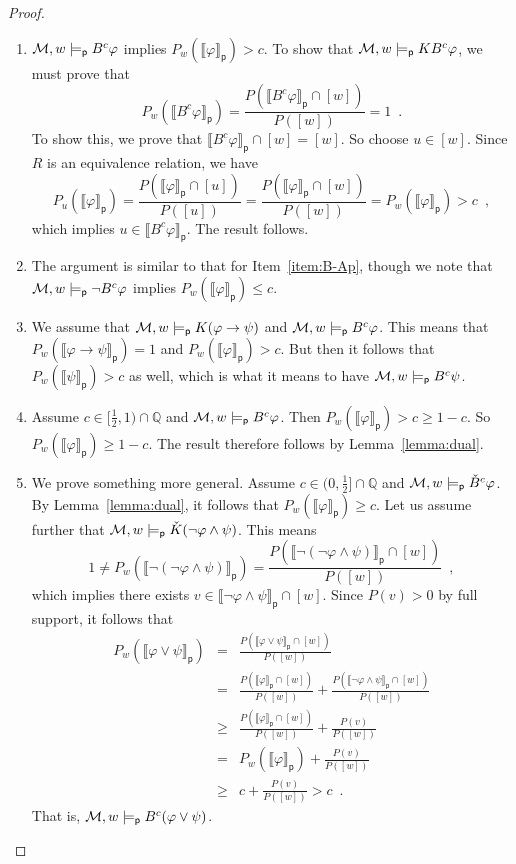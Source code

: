 \documentclass[12pt]{article}
\theoremstyle{definition}
\newcommand{\Rat}{\mathbb{Q}}  %
\newcommand{\M}{{\cal M}}      %
\newcommand{\modelsp}{\models_{\mathsf{p}}}                  %
\newcommand{\semp}[1]{\llbracket{#1}\rrbracket_{\mathsf{p}}} %
\begin{document}
\begin{proof}
\begin{enumerate}
  \item $\M,w\modelsp B^c\varphi$ implies $P_w(\semp{\varphi})>c$.  To show
    that $\M,w\modelsp KB^c\varphi$, we must prove that
    \[
    P_w(\semp{B^c\varphi})=
    \frac{P(\semp{B^c\varphi}\cap[w])}{P([w])} =1\enspace.
    \]
    To show this, we prove that $\semp{B^c\varphi}\cap[w]=[w]$.  So
    choose $u\in[w]$.  Since $R$ is an equivalence relation, we have
    \begin{equation*}
      P_u(\semp{\varphi})=
      \frac{P(\semp{\varphi}\cap[u])}{P([u])}=
      \frac{P(\semp{\varphi}\cap[w])}{P([w])}=
      P_w(\semp{\varphi})>c\enspace,
    \end{equation*}
    which implies $u\in\semp{B^c\varphi}$.  The result follows.
    
  \item The argument is similar to that for Item~\ref{item:B-Ap},
    though we note that $\M,w\modelsp\lnot B^c\varphi$ implies
    $P_w(\semp{\varphi})\leq c$.
    
  \item We assume that $\M,w\modelsp K(\varphi\to\psi)$ and
    $\M,w\modelsp B^c\varphi$.  This means that
    $P_w(\semp{\varphi\to\psi})=1$ and $P_w(\semp{\varphi})>c$.  But then it
    follows that $P_w(\semp{\psi})>c$ as well, which is what it means
    to have $\M,w\modelsp B^c\psi$.


  \item Assume $c\in[\frac 12,1)\cap\Rat$ and $\M,w\modelsp B^c\varphi$.
    Then $P_w(\semp{\varphi})>c \geq 1 - c$. So
    $P_w(\semp{\varphi})\geq 1-c$.  The result therefore follows by
    Lemma~\ref{lemma:dual}.

  \item We prove something more general.  Assume
    $c\in(0,\frac 12]\cap\Rat$ and $\M,w\modelsp\check B^c\varphi$.  By
    Lemma~\ref{lemma:dual}, it follows that $P_w(\semp{\varphi})\geq c$.
    Let us assume further that
    $\M,w\modelsp\check K(\lnot\varphi\land\psi)$.  This means
    \[
    1\neq P_w(\semp{\lnot(\lnot\varphi\land\psi)})=
    \frac{P(\semp{\lnot(\lnot\varphi\land\psi)}\cap[w])}{P([w])}
    \enspace,
    \]
    which implies there exists
    $v\in \semp{\lnot\varphi\land\psi}\cap[w]$.  Since $P(v)>0$ by
    full support, it follows that
    \begin{eqnarray*}
    P_w(\semp{\varphi\lor\psi}) &=&
    \frac{ P(\semp{\varphi\lor\psi}\cap [w]) }{ P([w]) }
    \\
    &=&
    \frac{ P(\semp{\varphi}\cap [w]) }{ P([w]) } +
    \frac{ P(\semp{\lnot\varphi\land\psi}\cap [w]) }{ P([w]) }
    \\
    &\geq&
    \frac{ P(\semp{\varphi}\cap[w]) }{P([w])} + \frac{ P(v) }{P([w])}
    \\
    &=&
    P_w(\semp{\varphi})+\frac{ P(v) }{P([w])}
    \\
    &\geq&
    c + \frac{ P(v) }{P([w])}
    > c\enspace.
    \end{eqnarray*}
    That is,
    $\M,w\modelsp B^c(\varphi\lor\psi)$.


\end{enumerate}
\end{proof}
\end{document}
